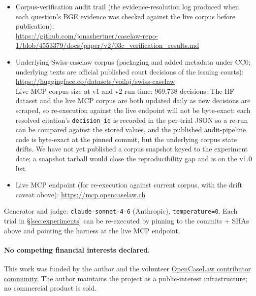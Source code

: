 \documentclass[11pt,a4paper]{article}
\begin{document}
\begin{itemize}
        SHA-256 of \texttt{questions.jsonl}:
        \texttt{b299db37\dots f21ec449}
  \item Corpus-verification audit trail (the
        evidence-resolution log produced when each question's
        BGE evidence was checked against the live corpus
        before publication): \\
        \url{https://github.com/jonashertner/caselaw-repo-1/blob/4553379/docs/paper/v2/03c_verification_results.md}
  \item Underlying Swiss-caselaw corpus (packaging and added
        metadata under CC0; underlying texts are official
        published court decisions of the issuing courts):
        \url{https://huggingface.co/datasets/voilaj/swiss-caselaw} \\
        Live MCP corpus size at v1 and v2 run time:
        969{,}738 decisions.  The HF dataset and the live
        MCP corpus are both updated daily as new decisions
        are scraped, so re-execution against the live
        endpoint will not be byte-exact: each resolved
        citation's \texttt{decision\_id} is recorded in the
        per-trial JSON so a re-run can be compared against
        the stored values, and the published audit-pipeline
        code is byte-exact at the pinned commit, but the
        underlying corpus state drifts.  We have not yet
        published a corpus snapshot keyed to the experiment
        date; a snapshot tarball would close the
        reproducibility gap and is on the v1.0 list.
  \item Live MCP endpoint (for re-execution against current
        corpus, with the drift caveat above):
        \url{https://mcp.opencaselaw.ch}
\end{itemize}

Generator and judge: \texttt{claude-sonnet-4-6} (Anthropic),
\texttt{temperature=0}.  Each trial in \S\ref{sec:experiments} can
be re-executed by pinning to the commits + SHAs above and pointing
the harness at the live MCP endpoint.

\paragraph{No competing financial interests declared.}  This work
was funded by the author and the volunteer
\href{https://github.com/jonashertner/caselaw-repo-1}{OpenCaseLaw
contributor community}.  The author maintains the project as a
public-interest infrastructure; no commercial product is sold.

\end{document}

